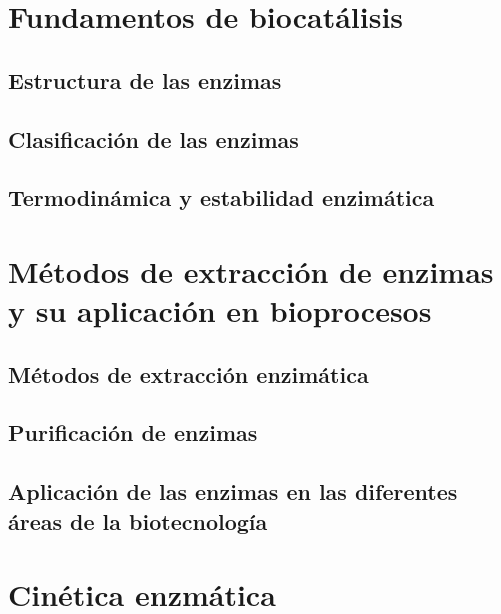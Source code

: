 \documentclass{../summarie}
\begin{document}
\frontmatter
    \Portada
    \tableofcontents
    \listoffigures
    \listoftables

\mainmatter
    
    \onehalfspacing
    \bibliographyunit[\chapter]


\part{Fundamentos de biocatálisis}

    \chapter{Estructura de las enzimas} 
    \chapter{Clasificación de las enzimas} 
    \chapter{Termodinámica y estabilidad enzimática} 
    
\part{Métodos de extracción de enzimas y su aplicación en bioprocesos}

    \chapter{Métodos de extracción enzimática} 
    \chapter{Purificación de enzimas} 
    \chapter{Aplicación de las enzimas en las diferentes áreas de la biotecnología}

\part{Cinética enzmática}
\end{document}
